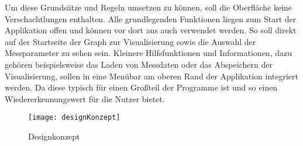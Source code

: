 Um diese Grundsätze und Regeln umsetzen zu können, soll die Oberfläche keine Verschachtlungen enthalten. Alle grundlegenden Funktionen liegen zum Start der Applikation offen und können vor dort aus auch verwendet werden. So soll direkt auf der Startseite der Graph zur Visualisierung sowie die Auswahl der Messparameter zu sehen sein. Kleinere Hilfsfunktionen und Informationen, dazu gehören beispielsweise das Laden von Messdaten oder das Abspeichern der Visualisierung, sollen in eine Menübar am oberen Rand der Applikation integriert werden. Da diese typisch für einen Großteil der Programme ist und so einen Wiedererkennungswert für die Nutzer bietet. 

\begin{figure}[H]
	\centering
	\texttt{[image: designKonzept]}
	\caption{Designkonzept}
	\label{fig:designKonzept}
\end{figure}